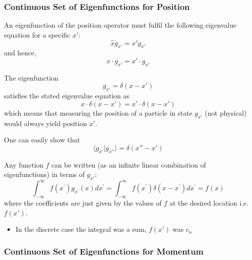 \subsubsection{Continuous Set of Eigenfunctions for Position}


An eigenfunction of the position operator must fulfil the following eigenvalue equation for a specific $x'$:
\begin{equation*}
    \hat{x}g_{x'} =x'g_{x'}
\end{equation*}
and hence,
\begin{equation*}
    x \cdot g_{x'} =x' \cdot g_{x'}
\end{equation*}


The eigenfunction
\begin{equation*}
    g_{x'}=\delta(x-x')
\end{equation*}
satisfies the stated eigenvalue equation as
\begin{equation*}
    x\cdot \delta(x-x')=x'\cdot \delta(x-x')
\end{equation*}
which means that measuring the position of a particle in state $g_{x'}$ (not physical) would always yield position $x'$.


One can easily show that
\begin{equation*}
    \langle g_{x'}|g_{x''}\rangle=\delta(x''-x')
\end{equation*}


Any function $f$ can be written (as an infinite linear combination of eigenfunctions) in terms of $g_{x'}$:
\begin{equation*}
    \int_{-\infty}^{\infty}f(x^{\prime})g_{x^{\prime}}(x)dx^{\prime}=\int_{-\infty}^{\infty}f(x^{\prime})\delta(x-x^{\prime})dx^{\prime}=f(x)
\end{equation*}
where the coefficients are just given by the values of $f$ at the desired location i.e. $f(x')$.


\begin{itemize}
    \item In the discrete case the integral was a sum, $f(x')$ was $c_n$
\end{itemize}

\subsubsection{Continuous Set of Eigenfunctions for Momentum}

